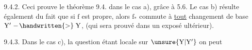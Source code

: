 9.4.2. Ceci prouve le théorème 9.4. dans le cas a), grâce à 5.6.
Le cas b) résulte également du fait que si $\mathrm{f}$ est propre, alors $\mathrm{f_*}$
commute à \uline{tout} changement de base $\mathrm{Y' \mathrel{\relbar\joinrel\handwritten{>}} Y}$, (qui sera prouvé dans un
exposé ultérieur).

9.4.3. Dans le cas c), la question étant locale sur $\mathrm{\unsure{Y|Y'}}$ on peut

